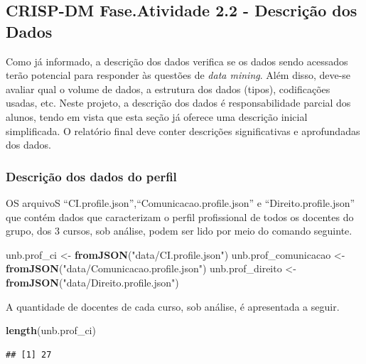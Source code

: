\documentclass[]{article}
\newenvironment{Shaded}{\begin{snugshade}}{\end{snugshade}}
\newcommand{\KeywordTok}[1]{\textcolor[rgb]{0.13,0.29,0.53}{\textbf{#1}}}
\newcommand{\StringTok}[1]{\textcolor[rgb]{0.31,0.60,0.02}{#1}}
\newcommand{\NormalTok}[1]{#1}
\begin{document}
\subsection{CRISP-DM Fase.Atividade 2.2 - Descrição dos
Dados}\label{crisp-dm-fase.atividade-2.2---descricao-dos-dados}

Como já informado, a descrição dos dados verifica se os dados sendo
acessados terão potencial para responder às questões de \emph{data
mining}. Além disso, deve-se avaliar qual o volume de dados, a estrutura
dos dados (tipos), codificações usadas, etc. Neste projeto, a descrição
dos dados é responsabilidade parcial dos alunos, tendo em vista que esta
seção já oferece uma descrição inicial simplificada. O relatório final
deve conter descrições significativas e aprofundadas dos dados.

\subsubsection{Descrição dos dados do
perfil}\label{descricao-dos-dados-do-perfil}

OS arquivoS ``CI.profile.json'',``Comunicacao.profile.json'' e
``Direito.profile.json'' que contém dados que caracterizam o perfil
profissional de todos os docentes do grupo, dos 3 cursos, sob análise,
podem ser lido por meio do comando seguinte.

\begin{Shaded}
\begin{Highlighting}[]
\NormalTok{unb.prof_ci <-}\StringTok{ }\KeywordTok{fromJSON}\NormalTok{(}\StringTok{"data/CI.profile.json"}\NormalTok{)}
\NormalTok{unb.prof_comunicacao <-}\StringTok{ }\KeywordTok{fromJSON}\NormalTok{(}\StringTok{"data/Comunicacao.profile.json"}\NormalTok{)}
\NormalTok{unb.prof_direito <-}\StringTok{ }\KeywordTok{fromJSON}\NormalTok{(}\StringTok{"data/Direito.profile.json"}\NormalTok{)}
\end{Highlighting}
\end{Shaded}

A quantidade de docentes de cada curso, sob análise, é apresentada a
seguir.

\begin{Shaded}
\begin{Highlighting}[]
\KeywordTok{length}\NormalTok{(unb.prof_ci)}
\end{Highlighting}
\end{Shaded}

\begin{verbatim}
## [1] 27
\end{verbatim}
\end{document}
